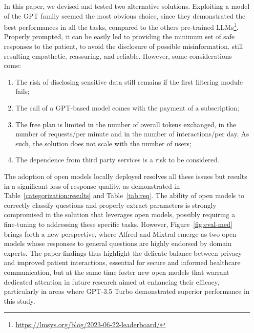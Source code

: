 \documentclass[preprint,12pt]{elsarticle}
\begin{document}
In this paper, we devised and tested two alternative solutions. 
%
Exploiting a model of the GPT family seemed the most obvious choice, since they demonstrated the best performances in all the tasks, compared to the others pre-trained LLMs\footnote{\url{https://lmsys.org/blog/2023-06-22-leaderboard/}}.
%
Properly prompted, it can be easily led to providing the minimum set of safe responses %
to the patient, to avoid the disclosure of possible misinformation, still resulting empathetic, reassuring, and reliable.
%
However, some considerations come: 
\begin{enumerate}
    \item The risk of disclosing sensitive data still remains if the first filtering module fails;
    \item The call of a GPT-based model comes with the payment of a subscription;
    \item The free plan is limited in the number of overall tokens exchanged, in the number of requests/per minute and in the number of interactions/per day. As such, the solution does not scale with the number of users;   
    \item The dependence from third party services is a risk to be considered.
\end{enumerate}
%
\noindent The adoption of open models locally deployed resolves all these issues but results in a significant loss of response quality, as demonstrated in~
 Table~\ref{categorization:results} and Table~\ref{tab:req}. 
%
The ability of open models to correctly classify questions and properly extract parameters is strongly compromised in the solution that leverages open models, possibly requiring a fine-tuning to addressing these specific tasks.
%
However, Figure~\ref{fig:eval-med} brings forth a new perspective, where Alfred and Mixtral emerge as two open models whose responses to general questions are highly endorsed by domain experts. 
%
The paper findings thus highlight the delicate balance between privacy and improved patient interactions, essential for secure and informed healthcare communication, but at the same time foster new open models that warrant dedicated attention in future research aimed at enhancing their efficacy, particularly in areas where GPT-3.5 Turbo demonstrated superior performance in this study.
\end{document}
